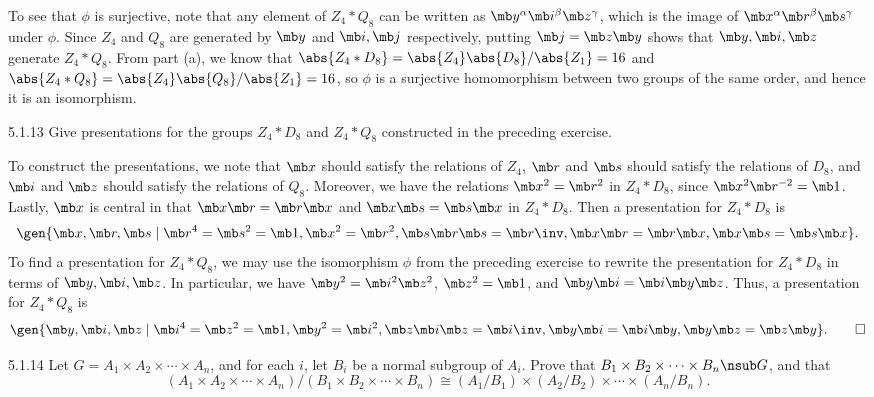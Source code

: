 \begin{solenum}
    To see that $\phi$ is surjective, note that any element of $Z_4 \ast Q_8$ can be written as $\mb y^\alpha \mb i^\beta \mb z^\gamma$, which is the image of $\mb x^\alpha \mb r^\beta \mb s^\gamma$ under $\phi$.
    Since $Z_4$ and $Q_8$ are generated by $\mb y$ and $\mb i, \mb j$ respectively, putting $\mb j = \mb z \mb y$ shows that $\mb y, \mb i, \mb z$ generate $Z_4 \ast Q_8$.
    From part (a), we know that $\abs{Z_4 \ast D_8} = \abs{Z_4}\abs{D_8}/\abs{Z_1} = 16$ and $\abs{Z_4 \ast Q_8} = \abs{Z_4}\abs{Q_8}/\abs{Z_1} = 16$, so $\phi$ is a surjective homomorphism between two groups of the same order, and hence it is an isomorphism.
\end{solenum}

\begin{exercise}{5.1.13}
    Give presentations for the groups $Z_4 \ast D_8$ and $Z_4 \ast Q_8$ constructed in the preceding exercise.
\end{exercise}

\begin{sol}
    To construct the presentations, we note that $\mb x$ should satisfy the relations of $Z_4$, $\mb r$ and $\mb s$ should satisfy the relations of $D_8$, and $\mb i$ and $\mb z$ should satisfy the relations of $Q_8$.
	Moreover, we have the relations $\mb x^2 = \mb r^2$ in $Z_4 \ast D_8$, since $\mb x^2\mb r^{-2} = \mb 1$.
	Lastly, $\mb x$ is central in that $\mb x \mb r = \mb r\mb x$ and $\mb x\mb s = \mb s\mb x$ in $Z_4 \ast D_8$.
	Then a presentation for $Z_4 \ast D_8$ is
    \[
    	\gen{\mb x, \mb r, \mb s \mid \mb r^4 = \mb s^2 = \mb 1, \mb x^2 = \mb r^2, \mb s\mb r\mb s = \mb r\inv, \mb x\mb r = \mb r\mb x, \mb x\mb s = \mb s\mb x}.
    \]
    To find a presentation for $Z_4 \ast Q_8$, we may use the isomorphism $\phi$ from the preceding exercise to rewrite the presentation for $Z_4 \ast D_8$ in terms of $\mb y, \mb i, \mb z$.
	In particular, we have $\mb y^2 = \mb i^2\mb z^2$, $\mb z^2 = \mb 1$, and $\mb y\mb i = \mb i\mb y\mb z$.
	Thus, a presentation for $Z_4 \ast Q_8$ is
    \[
    	\gen{\mb y, \mb i, \mb z \mid \mb i^4 = \mb z^2 = \mb 1, \mb y^2 = \mb i^2, \mb z\mb i \mb z = \mb i\inv, \mb y\mb i = \mb i\mb y, \mb y\mb z = \mb z\mb y}. \qedhere
    \]
\end{sol}

\begin{exercise}{5.1.14}
    Let $G = A_1 \times A_2 \times \cdots \times A_n$, and for each $i$, let $B_i$ be a normal subgroup of $A_i$.
	Prove that $B_1 \times B_2 \times \cdots \times B_n \nsub G$, and that
    \[
    	(A_1 \times A_2 \times \cdots \times A_n)/(B_1 \times B_2 \times \cdots \times B_n) \cong (A_1/B_1) \times (A_2/B_2) \times \cdots \times (A_n/B_n).
    \]
\end{exercise}

